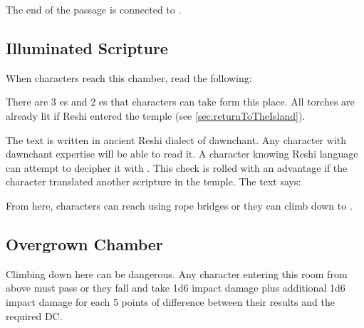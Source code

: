 The end of the passage is connected to .

\subsection{Illuminated Scripture}
\label{ssec:torchlightScripture}

When characters reach this chamber, read the following:


There are 3 \lootTorchShort{}es and 2 \lootTorchLong{}es that characters can take form this place. All torches are already lit if Reshi entered the temple (see \ref{sec:returnToTheIsland}).

The text is written in ancient Reshi dialect of dawnchant. Any character with dawnchant expertise will be able to read it. A character knowing Reshi language can attempt to decipher it with . This check is rolled with an advantage if the character translated another scripture in the temple. The text says:


From here, characters can reach  using rope bridges or they can climb down to .



\subsection{Overgrown Chamber}
\label{ssec:dungeonOvergrown}

Climbing down here can be dangerous. Any character entering this room from above must pass  or they fall and take 1d6 impact damage plus additional 1d6 impact damage for each 5 points of difference between their results and the required DC.


